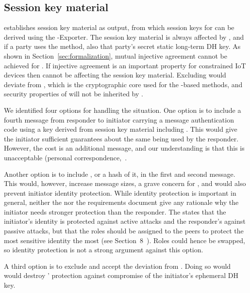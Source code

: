 \documentclass[runningheads, envcountsame, a4paper, draft, x11names]{llncs}
\newcommand{\fillhack}{\vspace{-0.5em}}
\begin{document}
\subsection{Session key material}
\label{sec:sessionKeyMaterial}
\fillhack
\mEdhoc{} establishes session key material as output, from which session keys
for \mOscore{} can be derived using the \mEdhoc{}-Exporter.
%
The session key material is always affected by \mGxy{}, and if a party uses the
\mStat{} method, also that party's secret static long-term DH key.
%
As shown in Section~\ref{sec:formalization}, mutual injective agreement cannot
be achieved for \mGiy{}.
%
If injective agreement is an important property for constrained IoT devices then
\mGiy{} cannot be affecting the session key material.
%
Excluding \mGiy{} would deviate from \mOptls{}, which is the cryptographic core
used for the \mStat-based methods, and security properties of \mOptls{} will not
be inherited by \mEdhoc{}.
%

We identified four options for handling the situation.
%
One option is to include a fourth message from responder to initiator
carrying a message authentication code using a key derived from session key
material including \mGiy{}.
%
This would give the initiator sufficient guarantees about the same \mGiy{}
being used by the responder.
%
However, the cost is an additional message, and our understanding is that this
is unacceptable (personal correspondence,~\cite{personalCorrespondence}.
%

Another option is to include \mGi{}, or a hash of it, in the first and
second message.
%
This would, however, increase message sizes, a grave concern for \mEdhoc{},
and would also prevent initiator identity protection.
%
While identity protection is important in general, neither the \mSpec{} nor
the requirements document give any rationale why the initiator needs stronger
protection than the responder.
%
The \mSpec{} states that the initiator's identity is protected against active
attacks and the responder's against passive attacks, but that the roles should
be assigned to the \mCoap{} peers to protect the most sensitive identity the
most (see Section~8~\cite{selander-lake-edhoc-01}).
%
Roles could hence be swapped, so identity protection is not a strong argument
against this option.
%

A third option is to exclude \mGiy{} and accept the deviation from \mOptls{}.
%
Doing so would would destroy \mOptls{}' protection against compromise of the
initiator's ephemeral DH key.
%
\end{document}
